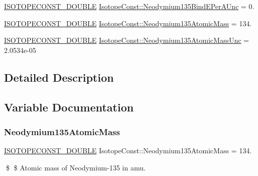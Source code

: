 \begin{DoxyCompactItemize}
\mbox{\hyperlink{group___isotope_const-_macros_ga8f45a7272ce02c0b4c65c44636ed719a}{I\+S\+O\+T\+O\+P\+E\+C\+O\+N\+S\+T\+\_\+\+D\+O\+U\+B\+LE}} \mbox{\hyperlink{group___isotope_const-_neodymium-_nd135_gac88ae59c9e82f68fabd3d3892f62709c}{Isotope\+Const\+::\+Neodymium135\+Bind\+E\+Per\+A\+Unc}} = 0.
\item 
\mbox{\hyperlink{group___isotope_const-_macros_ga8f45a7272ce02c0b4c65c44636ed719a}{I\+S\+O\+T\+O\+P\+E\+C\+O\+N\+S\+T\+\_\+\+D\+O\+U\+B\+LE}} \mbox{\hyperlink{group___isotope_const-_neodymium-_nd135_ga32daa6445fa82aa700152a66e6d92089}{Isotope\+Const\+::\+Neodymium135\+Atomic\+Mass}} = 134.
\item 
\mbox{\hyperlink{group___isotope_const-_macros_ga8f45a7272ce02c0b4c65c44636ed719a}{I\+S\+O\+T\+O\+P\+E\+C\+O\+N\+S\+T\+\_\+\+D\+O\+U\+B\+LE}} \mbox{\hyperlink{group___isotope_const-_neodymium-_nd135_ga4bcb8c787c4753e6ab011247c26ff52a}{Isotope\+Const\+::\+Neodymium135\+Atomic\+Mass\+Unc}} = 2.\+0534e-\/05
\end{DoxyCompactItemize}


\subsection{Detailed Description}


\subsection{Variable Documentation}
\mbox{\label{group___isotope_const-_neodymium-_nd135_ga32daa6445fa82aa700152a66e6d92089}} 
\subsubsection{\texorpdfstring{Neodymium135\+Atomic\+Mass}{Neodymium135AtomicMass}}
{\footnotesize\ttfamily \mbox{\hyperlink{group___isotope_const-_macros_ga8f45a7272ce02c0b4c65c44636ed719a}{I\+S\+O\+T\+O\+P\+E\+C\+O\+N\+S\+T\+\_\+\+D\+O\+U\+B\+LE}} Isotope\+Const\+::\+Neodymium135\+Atomic\+Mass = 134.}

\$ \$ Atomic mass of Neodymium-\/135 in amu. \mbox{\label{group___isotope_const-_neodymium-_nd135_ga4bcb8c787c4753e6ab011247c26ff52a}} 
